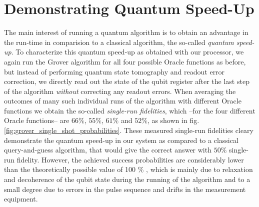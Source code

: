 \section{Demonstrating Quantum Speed-Up}

The main interest of running a quantum algorithm is to obtain an advantage in the run-time in comparision to a classical algorithm, the so-called {\it quantum speed-up}. To characterize this quantum speed-up as obtained with our processor, we again run the Grover algorithm for all four possible Oracle functions as before, but instead of performing quantum state tomography and readout error correction, we directly read out the state of the qubit register after the last step of the algorithm {\it without} correcting any readout errors. When averaging the outcomes of many such individual runs of the algorithm with different Oracle functions we obtain the so-called {\it single-run fidelities}, which --for the four different Oracle functions-- are $66 \%$, $55\%$, $61\%$ and $52\%$, as shown in fig. \ref{fig:grover_single_shot_probabilities}. These measured single-run fidelities cleary demonstrate the quantum speed-up in our system as compared to a classical query-and-guess algorithm, that would give the correct answer with $50\%$ single-run fidelity. However, the achieved success probabilities are considerably lower than the theoretically possible value of 100 \% , which is mainly due to relaxation and decoherence of the qubit state during the running of the algorithm and to a small degree due to errors in the pulse sequence and drifts in the measurement equipment.

